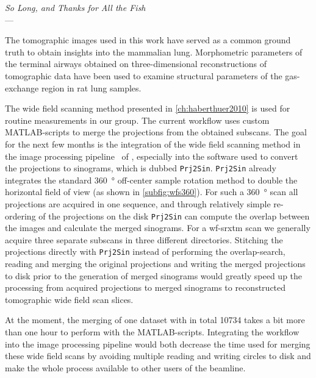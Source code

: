 \acresetall
{}\label{ch:outlook}
\begin{flushright}{\slshape    
		So Long, and Thanks for All the Fish} \\ \medskip
    ---  \citep{Adams1984}
\end{flushright}

\vfill

The tomographic images used in this work have served as a common ground truth to obtain insights into the mammalian lung. Morphometric parameters of the terminal airways obtained on three-dimensional reconstructions of tomographic data have been used to examine structural parameters of the gas-exchange region in rat lung samples.

The wide field scanning method presented in \autoref{ch:haberthuer2010} is used for routine measurements in our group. The current workflow uses custom MATLAB-scripts to merge the projections from the obtained subscans. The goal for the next few months is the integration of the wide field scanning method in the image processing pipeline~\cite{Hintermueller2010} of , especially into the software used to convert the projections to sinograms, which is dubbed \verb+Prj2Sin+. \verb+Prj2Sin+ already integrates the standard \SI{360}{\degree} off-center sample rotation method to double the horizontal field of view (as shown in \autoref{subfig:wfs360}). For such a \SI{360}{\degree} scan all projections are acquired in one sequence, and through relatively simple re-ordering of the projections on the disk \verb+Prj2Sin+ can compute the overlap between the images and calculate the merged sinograms. For a \ac{wf-srxtm} scan we generally acquire three separate subscans in three different directories. Stitching the projections directly with \verb+Prj2Sin+ instead of performing the overlap-search, reading and merging the original projections and writing the merged projections to disk prior to the generation of merged sinograms would greatly speed up the processing from acquired projections to merged sinograms to reconstructed tomographic wide field scan slices.

At the moment, the merging of one dataset with in total \num{10734} takes a bit more than one hour to perform with the MATLAB-scripts. Integrating the workflow into the image processing pipeline would both decrease the time used for merging these wide field scans by avoiding multiple reading and writing circles to disk and make the whole process available to other users of the beamline.

